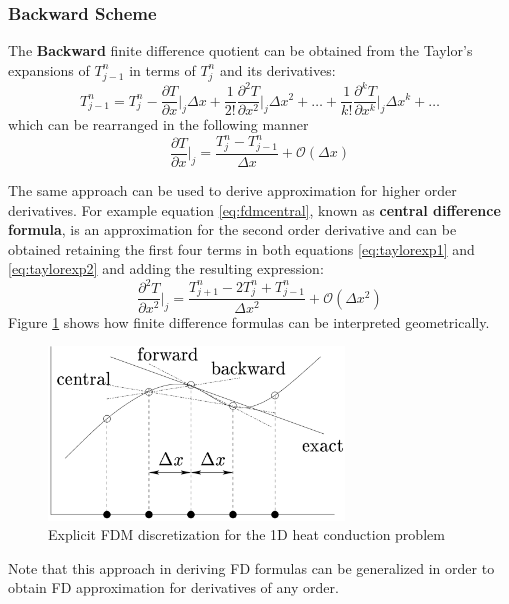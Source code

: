   \subsubsection{Backward Scheme}  
    The \textbf{Backward} finite difference quotient can be obtained from the Taylor's expansions of  $T^n_{j-1}$  in terms of $T^n_{j}$ and its derivatives:
    \begin{equation}
    T^n_{j-1} = T^n_{j} - 
    \frac{\partial T}{\partial x}\bigg\rvert_j \Delta x +
    \frac{1}{2!}  \frac{\partial^2 T}{\partial x^2}\bigg\rvert_j \Delta x^2 + \ldots + 
     \frac{1}{k!}  \frac{\partial^k T}{\partial x^k}\bigg\rvert_j \Delta x^k + \ldots
     \label{eq:taylorexp2}
    \end{equation}    
    which can be rearranged in the following manner
    \begin{equation}
    \frac{\partial T}{\partial x}\bigg\rvert_j  = \frac{T^n_{j} - T^n_{j-1}}{\Delta x} + \mathcal{O}(\Delta x)
    \label{eq:fdmfbackward}
    \end{equation}
    
   The same approach can be used to derive approximation for higher order derivatives.
   For example equation \ref{eq:fdmcentral}, known as \textbf{central difference formula}, is an approximation for the second order derivative and can be obtained retaining the first four terms in both equations \ref{eq:taylorexp1} and \ref{eq:taylorexp2} and adding the resulting expression:   
    \begin{equation}
		\frac{\partial^2 T}{\partial x^2}\bigg\rvert_j = \frac{T^n_{j+1}- 2T^n_{j} + T^n_{j-1}}{\Delta x^2} + \mathcal{O}(\Delta x^2)
		\label{eq:fdmcentral}
    \end{equation}    
    Figure \ref{fig:geometrical_intepretation} shows how finite difference formulas can be interpreted geometrically.
\begin{figure}
	\centering
	\includegraphics[width=0.70\textwidth]{./images/CA_FDM/geometrical_interpretation_fd}
	\caption{Explicit FDM discretization for the 1D heat conduction problem}
	\label{fig:geometrical_intepretation}
\end{figure}     
Note that this approach in deriving FD formulas can be generalized in order to obtain FD approximation for derivatives of any order.

